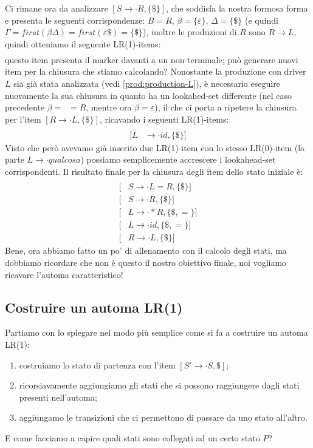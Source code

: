 \documentclass[class=book, crop=false, oneside, 12pt]{standalone}
\begin{document}
Ci rimane ora da analizzare \([S \to \cdot R, \{\$\}]\), che soddisfa la nostra formosa forma e presenta le seguenti corrispondenze: \(B = R \texttt{, } \beta = \{\varepsilon\} \texttt{, } \Delta = \{\$\}\) (e quindi \(\Gamma = first(\beta \Delta) = first(\varepsilon \$) = \{\$\}\)), inoltre le produzioni di \(R\) sono \(R \to L\), quindi otteniamo il seguente LR(1)-items:
\begin{align*}
    [R &\to \cdot L, \{\$\}]
\end{align*}
questo item presenta il marker davanti a un non-terminale; può generare nuovi item per la chiusura che stiamo calcolando?
Nonostante la produzione con driver \(L\) sia già stata analizzata (vedi \ref{prod:production-L}), è necessario eseguire nuovamente la sua chiusura in quanto ha un lookahed-set differente (nel caso precedente \(\beta= \; \;  =R\), mentre ora \(\beta=\varepsilon\)), il che ci porta a ripetere la chiusura per l'item \([R \to \cdot L, \{\$\}]\), ricavando i seguenti LR(1)-items:
\begin{align*}
    [L &\to \cdot *R, \{\$\}] \\
    [L &\to \cdot id, \{\$\}]
\end{align*}
Visto che però avevamo già inserito due LR(1)-item con lo stesso LR(0)-item (la parte \(L \to \cdot qualcosa\)) possiamo semplicemente accrescere i lookahead-set corrispondenti. Il risultato finale per la chiusura degli item dello stato iniziale è:
\begin{align*}
    [&S'\to \cdot S, \{\$\}] \\
    [&S \to \cdot L = R, \{\$\}] \\
    [&S \to \cdot R, \{\$\}] \\
    [&L \to \cdot *R, \{\$, =\}] \\
    [&L \to \cdot id, \{\$, =\}] \\
    [&R \to \cdot L, \{\$\}]
\end{align*}
Bene, ora abbiamo fatto un po' di allenamento con il calcolo degli stati, ma dobbiamo ricordare che non è questo il nostro obiettivo finale, noi vogliamo ricavare l'automa caratteristico!

\subsection{Costruire un automa LR(1)}
Partiamo con lo spiegare nel modo più semplice come si fa a costruire un automa LR(1):
\begin{enumerate}
    \item costruiamo lo stato di partenza con l'item \([S' \to \cdot S, {\$}]\);
    \item ricorsiavamente aggiungiamo gli stati che si possono raggiungere dagli stati presenti nell'automa;
    \item aggiungamo le transizioni che ci permettono di passare da uno stato all'altro.
\end{enumerate}
E come facciamo a capire quali stati sono collegati ad un certo stato \(P\)?
\end{document}
